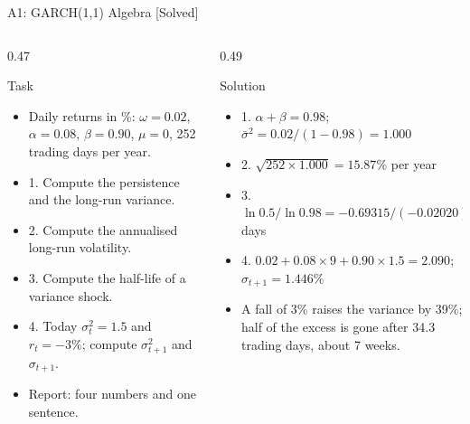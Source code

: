 \begin{frame}{A1: GARCH(1,1) Algebra [Solved]}
\itemsize{\scriptsize}
\begin{columns}[T]
\begin{column}{0.47\textwidth}
\begin{block}{Task}
\begin{itemize}
    \item Daily returns in \%: $\omega = 0.02$, $\alpha = 0.08$, $\beta = 0.90$, $\mu = 0$, 252 trading days per year.
    \item 1. Compute the persistence and the long-run variance.
    \item 2. Compute the annualised long-run volatility.
    \item 3. Compute the half-life of a variance shock.
    \item 4. Today $\sigma_t^2 = 1.5$ and $r_t = -3\%$; compute $\sigma_{t+1}^2$ and $\sigma_{t+1}$.
    \item Report: four numbers and one sentence.
\end{itemize}
\end{block}
\end{column}
\begin{column}{0.49\textwidth}
\begin{exampleblock}{Solution}
\begin{itemize}
    \item 1. $\alpha + \beta = 0.98$; $\bar\sigma^2 = 0.02/(1 - 0.98) = 1.000$
    \item 2. $\sqrt{252 \times 1.000} = 15.87\%$ per year
    \item 3. $\ln 0.5/\ln 0.98 = -0.69315/(-0.02020) = 34.3$ days
    \item 4. $0.02 + 0.08 \times 9 + 0.90 \times 1.5 = 2.090$; $\sigma_{t+1} = 1.446\%$
    \item A fall of 3\% raises the variance by 39\%; half of the excess is gone after 34.3 trading days, about 7 weeks.
\end{itemize}
\end{exampleblock}
\end{column}
\end{columns}
\end{frame}

